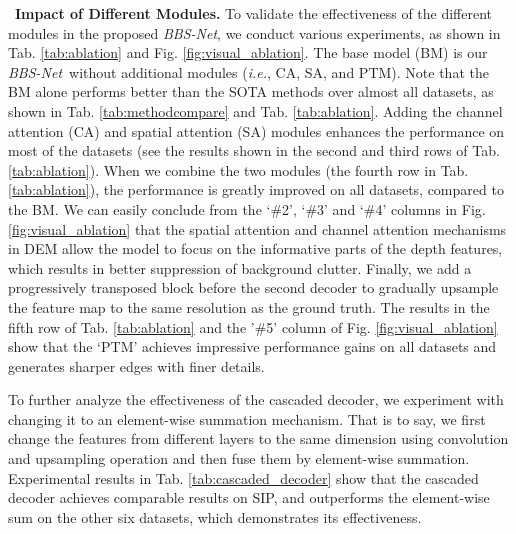 \documentclass[journal]{IEEEtran}
\newcommand{\tabref}[1]{Tab. \ref{#1}}
\newcommand{\figref}[1]{Fig. \ref{#1}}
\newcommand{\myPara}[1]{\vspace{10pt}\noindent~\textbf{#1} \quad}
\def\ie{\emph{i.e.}}
\def\ourmodel{\emph{BBS-Net}}
\begin{document}
\myPara{\textbf{Impact of Different Modules.}} To validate the effectiveness of the different modules in the proposed \ourmodel, we conduct various experiments, as shown in \tabref{tab:ablation} and \figref{fig:visual_ablation}.
The base model (BM) is our \ourmodel ~without additional modules (\ie, CA, SA, and PTM).
Note that the BM alone performs better than the SOTA methods over almost all datasets, as shown in \tabref{tab:methodcompare} and \tabref{tab:ablation}.
Adding the channel attention (CA) and spatial attention (SA) modules enhances the performance on most of the datasets (see the results shown in the second and third rows of \tabref{tab:ablation}).
When we combine the two modules (the fourth row in \tabref{tab:ablation}), the performance is greatly improved on all datasets, compared to the BM.
We can easily conclude from the `\#2', `\#3' and `\#4' columns in 
\figref{fig:visual_ablation} that the spatial attention and
channel attention mechanisms in DEM allow the model to focus on the informative parts of the depth features, which results in better suppression of background clutter.
Finally, we add a progressively transposed block before the second decoder to gradually upsample the feature map to the same resolution as the ground truth.
The results in the fifth row of \tabref{tab:ablation} and the '\#5' column of \figref{fig:visual_ablation} show that the `PTM' achieves impressive performance gains on all datasets and generates sharper edges with finer details. 
\par
To further analyze the effectiveness of the cascaded decoder, we experiment with changing it to an element-wise summation mechanism.
That is to say, we first change the features from different layers to the same dimension using  convolution and upsampling operation and then fuse them by element-wise summation.
Experimental results in \tabref{tab:cascaded_decoder} show that the cascaded decoder achieves comparable results on SIP, and outperforms the element-wise sum on the other six datasets, which demonstrates its effectiveness.
\begin{table}[t!]
	\vspace{-5pt}
	\caption{  Effectiveness analysis of the cascaded decoder in terms of the S-measure () on seven datasets.}
	\vspace{-5pt}
	\label{tab:cascaded_decoder}
	\centering
\renewcommand{\arraystretch}{0.5}
\end{table}
\end{document}

